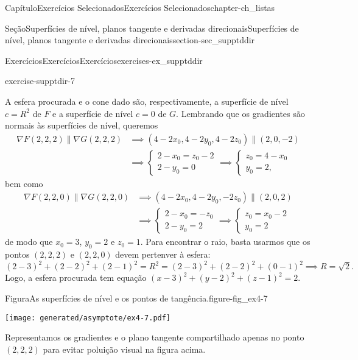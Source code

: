 \documentclass[oneside,10pt,]{book}
\numberwithin{equation}{section}
\begin{document}
\begin{chapterptx}{Capítulo}{Exercícios Selecionados}{}{Exercícios Selecionados}{}{}{chapter-ch_listas}
\begin{sectionptx}{Seção}{Superfícies de nível, planos tangente e derivadas direcionais}{}{Superfícies de nível, planos tangente e derivadas direcionais}{}{}{section-sec_supptddir}
\begin{exercises-subsection-numberless}{Exercícios}{Exercícios}{}{Exercícios}{}{}{exercises-ex_supptddir}
\begin{divisionexercise}{7}{}{}{exercise-supptdir-7}
%
\par
A esfera procurada e o cone dado são, respectivamente, a superfície de nível \(c=R^2\) de \(F\) e a superfície de nível \(c=0\) de \(G\). Lembrando que os gradientes são normais às superfícies de nível, queremos%
\begin{align*}
\nabla F(2,2,2) \parallel\nabla G(2,2,2) &\implies
(4-2x_0, 4-2y_0, 4-2z_0) \parallel (2,0,-2)\\
&\implies \begin{cases} 2-x_0 = z_0-2\\ 2-y_0=0
\end{cases} \implies \begin{cases} z_0 = 4-x_0\\ y_0=2,
\end{cases}
\end{align*}
bem como%
\begin{align*}
\nabla F(2,2,0)\parallel \nabla G(2,2,0) &\implies
(4-2x_0, 4-2y_0, -2z_0)\parallel (2,0,2)\\
&\implies \begin{cases} 2-x_0 = -z_0\\2-y_0=2
\end{cases} \implies \begin{cases} z_0 = x_0 - 2\\ y_0=2
\end{cases}
\end{align*}
de modo que \(x_0 = 3\), \(y_0 = 2\) e \(z_0=1\). Para encontrar o raio, basta usarmos que os pontos \((2,2,2)\) e \((2,2,0)\) devem pertenver à esfera:%
\begin{equation*}
(2-3)^2 + (2-2)^2 +
(2-1)^2 = R^2 = (2-3)^2 + (2-2)^2 + (0-1)^2\implies R =
\sqrt{2}.
\end{equation*}
Logo, a esfera procurada tem equação \((x-3)^2 +
(y-2)^2 + (z-1)^2 = 2\). \begin{figureptx}{Figura}{As superfícies de nível e os pontos de tangência.}{figure-fig_ex4-7}{}%
\begin{image}{0.25}{0.5}{0.25}{}%
\texttt{[image: generated/asymptote/ex4-7.pdf]}
\end{image}%
\tcblower
\end{figureptx}%
%
\par
Representamos os gradientes e o plano tangente compartilhado apenas no ponto \((2,2,2)\) para evitar poluição visual na figura acima.%
\end{divisionexercise}%
\end{exercises-subsection-numberless}

\end{sectionptx}
\end{chapterptx}
\end{document}
